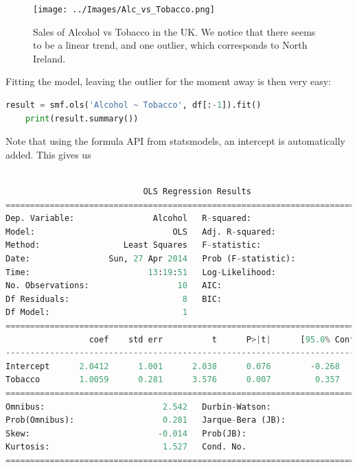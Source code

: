 \begin{figure}
  \centering
  \texttt{[image: ../Images/Alc\_vs\_Tobacco.png]}\\
  \caption{Sales of Alcohol vs Tobacco in the UK. We notice that there seems to be a linear trend, and one outlier, which corresponds to North Ireland.}
\end{figure}


Fitting the model, leaving the outlier for the moment away is then very easy:

\begin{lstlisting}[language=Python]
    result = smf.ols('Alcohol ~ Tobacco', df[:-1]).fit()
    print(result.summary())
\end{lstlisting}

Note that using the formula API from statsmodels, an intercept is automatically added.  This gives us
\small\begin{lstlisting}[language=Python]

                            OLS Regression Results
==============================================================================
Dep. Variable:                Alcohol   R-squared:                       0.615
Model:                            OLS   Adj. R-squared:                  0.567
Method:                 Least Squares   F-statistic:                     12.78
Date:                Sun, 27 Apr 2014   Prob (F-statistic):            0.00723
Time:                        13:19:51   Log-Likelihood:                -4.9998
No. Observations:                  10   AIC:                             14.00
Df Residuals:                       8   BIC:                             14.60
Df Model:                           1
==============================================================================
                 coef    std err          t      P>|t|      [95.0% Conf. Int.]
------------------------------------------------------------------------------
Intercept      2.0412      1.001      2.038      0.076        -0.268     4.350
Tobacco        1.0059      0.281      3.576      0.007         0.357     1.655
==============================================================================
Omnibus:                        2.542   Durbin-Watson:                   1.975
Prob(Omnibus):                  0.281   Jarque-Bera (JB):                0.904
Skew:                          -0.014   Prob(JB):                        0.636
Kurtosis:                       1.527   Cond. No.                         27.2
==============================================================================
\end{lstlisting}
\normalsize


